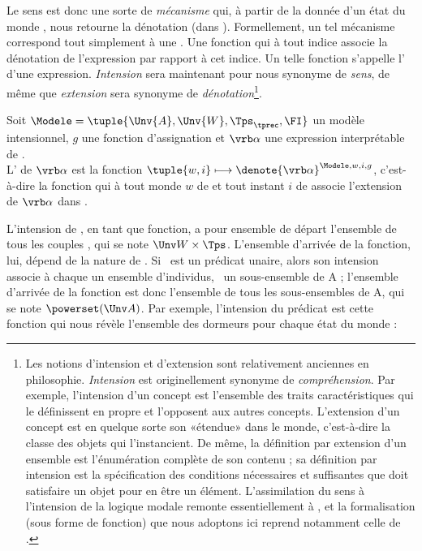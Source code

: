Le sens est donc une sorte de \emph{mécanisme} qui, à partir de la donnée d'un état du monde , nous retourne la dénotation (dans ).
Formellement, un tel mécanisme correspond tout simplement à une .
Une fonction qui à tout indice  associe la dénotation de l'expression par rapport à cet indice.
Un telle fonction s'appelle l' d'une expression. \emph{Intension} sera maintenant pour nous synonyme de \emph{sens}, de même que \emph{extension} sera synonyme de \emph{dénotation}\footnote{Les notions d'intension et d'extension sont relativement anciennes en philosophie. \emph{Intension} est originellement synonyme de \emph{compréhension}. Par exemple, l'intension d'un concept est l'ensemble des traits caractéristiques qui le définissent en propre et l'opposent aux autres concepts.  L'extension d'un concept est en quelque sorte son «étendue» dans le monde, c'est-à-dire la classe des objets qui l'instancient. De même, la définition par extension d'un ensemble est l'énumération complète de son contenu ; sa définition par intension est la spécification des conditions nécessaires et suffisantes que doit satisfaire un objet pour en être un élément. L'assimilation du sens à l'intension de la logique modale remonte essentiellement à \citet{Carnap:47}, et la formalisation (sous forme de fonction) que nous adoptons ici reprend notamment celle de \citet{Kripke:63af}.}. 

\begin{defi}[Intension]\label{def:intension}
Soit \(\Modele=\tuple{\Unv{A},\Unv{W},\Tps_{\tprec},\FI}\) un modèle intensionnel, $g$ une fonction d'assignation
et $\vrb\alpha$ une expression interprétable de {\LO}.  
\\
L'
de $\vrb\alpha$ est la fonction $\tuple{w,i} \longmapsto
\denote{\vrb\alpha}^{\Modele,w,i,g}$, c'est-à-dire la fonction qui à tout
monde $w$ de  et tout instant $i$ de {\Tps} associe l'extension de $\vrb\alpha$ dans . 
\end{defi}


L'intension de \vrb\alpha, en tant que fonction, a pour ensemble de départ l'ensemble de tous les couples , qui se note $\Unv W\times\Tps$.  L'ensemble d'arrivée de la fonction, lui, dépend de la nature de \vrb\alpha.  
Si \vrb\alpha\ est un prédicat unaire, alors son intension associe à chaque  un ensemble d'individus, \ie\ un sous-ensemble de \Unv A ; l'ensemble d'arrivée de la fonction est donc l'ensemble de tous les sous-ensembles de \Unv A, qui se note $\powerset(\Unv A)$.
Par exemple, l'intension du prédicat  est cette fonction qui nous révèle l'ensemble des dormeurs pour chaque état du monde :

